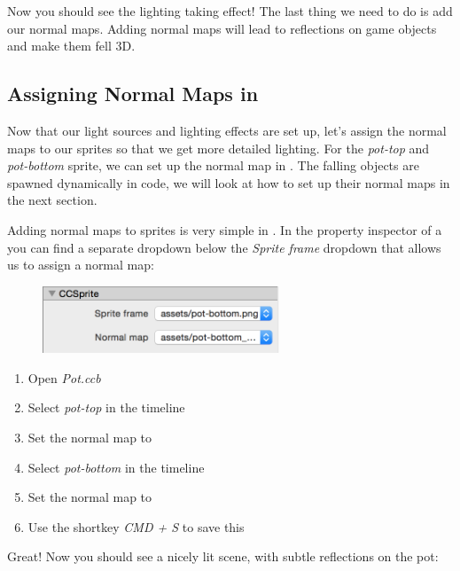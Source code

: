 Now you should see the lighting taking effect! The last thing we need to do is
add our normal maps. Adding normal maps will lead to reflections on game objects
and make them fell 3D.

\subsection{Assigning Normal Maps in \SB{}}
Now that our light sources and lighting effects are set up, let's assign the
normal maps to our sprites so that we get more detailed lighting. For the \textit{pot-top}
and \textit{pot-bottom} sprite, we can set up the normal map in \SB{}. The
falling objects are spawned dynamically in code, we will look at how to set up
their normal maps in the next section.

Adding normal maps to sprites is very simple in \SB{}. In the property
inspector of a \ccsprite{} you can find a separate dropdown below the
\textit{Sprite frame} dropdown that allows us to assign a normal map:

\begin{figure}[H]
  \centering
  \includegraphics[width=200pt]{images/Chapter9/select_normal_map.png}
\end{figure}

\begin{leftbar}
\begin{enumerate}
  \item Open \textit{Pot.ccb}
  \item Select \textit{pot-top} in the timeline 
  \item Set the normal map to 
  \item Select \textit{pot-bottom} in the timeline
  \item Set the normal map to 
  \item Use the shortkey \textit{CMD + S} to save this \ccbfile{}
\end{enumerate}
\end{leftbar}

Great! Now you should see a nicely lit scene, with subtle reflections on the
pot:

